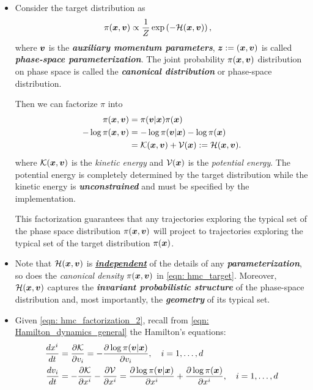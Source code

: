 \documentclass[11pt]{article}
\begin{document}
\begin{itemize}
\item Consider the target distribution as
\begin{align}
\pi(\boldsymbol{x}, \boldsymbol{v}) &\propto \frac{1}{Z}\exp\left(-{\mathcal H}(\boldsymbol{x}, \boldsymbol{v})\right), \label{eqn: hmc_target} 
\end{align} where $\boldsymbol{v}$ is the \emph{\textbf{auxiliary momentum parameters}}, $\boldsymbol{z} := (\boldsymbol{x}, \boldsymbol{v})$ is called \emph{\textbf{phase-space parameterization}}. The joint probability $\pi(\boldsymbol{x}, \boldsymbol{v})$ distribution on phase space is called the \emph{\textbf{canonical distribution}} or phase-space distribution.

Then we can factorize $\pi$ into
\begin{align}
\pi(\boldsymbol{x}, \boldsymbol{v}) &= \pi(\boldsymbol{v}|\boldsymbol{x})\pi(\boldsymbol{x}) \label{eqn: hmc_factorization} \\
-\log \pi(\boldsymbol{x}, \boldsymbol{v}) &= -\log \pi(\boldsymbol{v}|\boldsymbol{x}) - \log \pi(\boldsymbol{x}) \nonumber\\
&={\mathcal K}(\boldsymbol{x}, \boldsymbol{v}) + {\mathcal V}(\boldsymbol{x}) := {\mathcal H}(\boldsymbol{x}, \boldsymbol{v}).\label{eqn: hmc_factorization_2}
\end{align}  where ${\mathcal K}(\boldsymbol{x}, \boldsymbol{v})$ is the \emph{kinetic energy} and $ {\mathcal V}(\boldsymbol{x})$ is the \emph{potential energy}. The potential energy is completely determined by the target distribution while the kinetic energy is \emph{\textbf{unconstrained}} and must be specified by the implementation.

This factorization guarantees that any trajectories exploring the typical set of the phase space distribution $\pi(\boldsymbol{x}, \boldsymbol{v})$ will project to trajectories exploring the typical set of the target distribution $\pi(\boldsymbol{x})$.

\item Note that ${\mathcal H}(\boldsymbol{x}, \boldsymbol{v})$ is \underline{\emph{\textbf{independent}}} of the details of any \emph{\textbf{parameterization}}, so does the \emph{canonical density} $\pi(\boldsymbol{x}, \boldsymbol{v})$ in \eqref{eqn: hmc_target}. Moreover, ${\mathcal H}(\boldsymbol{x}, \boldsymbol{v})$ captures the \emph{\textbf{invariant probabilistic structure}} of the phase-space distribution and, most importantly, the \emph{\textbf{geometry}} of its typical set.

\item  Given \eqref{eqn: hmc_factorization_2}, recall from \eqref{eqn: Hamilton_dynamics_general} the Hamilton's equations:
\begin{align}
\frac{d x^{i}}{dt} &=  \frac{\partial {\mathcal K}}{ \partial v_{i}} = -\frac{\partial \log \pi(\boldsymbol{v}|\boldsymbol{x})}{ \partial v_{i}}, \quad  i=1,\ldots, d \nonumber\\
\frac{d v_{i}}{dt} &= - \frac{\partial {\mathcal K}}{ \partial x^{i}} - \frac{\partial {\mathcal V}}{ \partial x^{i}} = \frac{\partial \log \pi(\boldsymbol{v}|\boldsymbol{x})}{ \partial x^{i}}+\frac{\partial \log \pi(\boldsymbol{x})}{ \partial x^{i}}, \quad  i=1,\ldots, d \label{eqn: hmc_hamiltonian_eqn}
\end{align}

\end{itemize}
\end{document}
